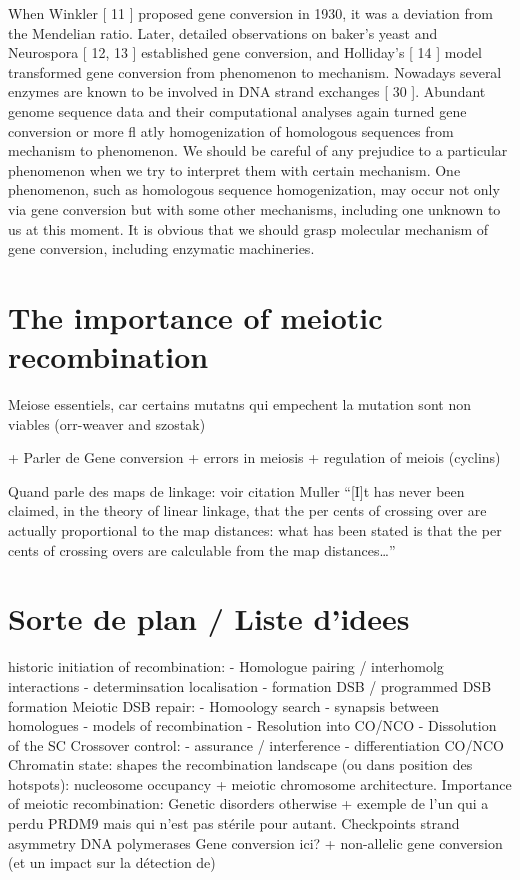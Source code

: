 When Winkler [ 11  ] proposed gene conversion in 1930, it was a deviation from
the Mendelian ratio. Later, detailed observations on baker’s yeast and Neurospora
[ 12, 13  ] established gene conversion, and Holliday’s [ 14  ] model transformed
gene conversion from phenomenon to mechanism. Nowadays several enzymes
are known to be involved in DNA strand exchanges [ 30  ]. Abundant genome
sequence data and their computational analyses again turned gene conversion or
more fl atly homogenization of homologous sequences from mechanism to phenomenon. We should be careful of any prejudice to a particular phenomenon when we
try to interpret them with certain mechanism. One phenomenon, such as homologous sequence homogenization, may occur not only via gene conversion but with
some other mechanisms, including one unknown to us at this moment. It is obvious
that we should grasp molecular mechanism of gene conversion, including enzymatic
machineries. 


\section{The importance of meiotic recombination}

Meiose essentiels, car certains mutatns qui empechent la mutation sont non viables (orr-weaver and szostak)

+ Parler de Gene conversion
+ errors in meiosis
+ regulation of meiois (cyclins)



Quand parle des maps de linkage: voir citation Muller %
“[I]t has never been claimed, in the theory of linear linkage, that the per cents of crossing over are actually proportional to the map distances: what has been stated is that the per cents of crossing overs are calculable from the map distances…”





\section*{Sorte de plan / Liste d'idees}
historic
initiation of recombination: 
- Homologue pairing / interhomolg interactions
- determinsation localisation
- formation DSB / programmed DSB formation
Meiotic DSB repair:
- Homoology search
- synapsis between homologues
- models of recombination
- Resolution into CO/NCO
- Dissolution of the SC
Crossover control: 
- assurance / interference
- differentiation CO/NCO
Chromatin state: shapes the recombination landscape (ou dans position des hotspots): nucleosome occupancy + meiotic chromosome architecture. 
Importance of meiotic recombination: Genetic disorders otherwise + exemple de l'un qui a perdu PRDM9 mais qui n'est pas stérile pour autant. 
Checkpoints
strand asymmetry
DNA polymerases
Gene conversion ici? + non-allelic gene conversion (et un impact sur la détection de)



